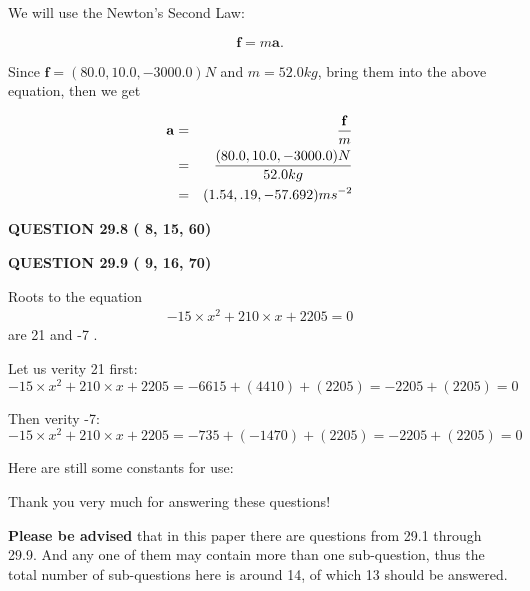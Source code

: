 \documentclass[12pt]{article}
\begin{document}
  
 
 

We will use the Newton's Second Law:
 
\[
\mathbf{f}=m\mathbf{a}.
\]
 
Since $\mathbf{f}= %
(80.0 , 10.0 , -3000.0) N$
and $m= %
52.0kg$, bring them into the above equation, then we get
 
\begin{eqnarray*}
\mathbf{a}&=&\frac{\mathbf{f}}m  \\
&=&\frac{ %
(80.0 , 10.0 , -3000.0) N}{ %
52.0kg}  \\
&=& %
(1.54 , .19 , -57.692) ms^{-2}
\end{eqnarray*}
 
 
 
  
\vspace{0.2in}
  
{\textbf{\Large{QUESTION
29.8 
 (          8,         15,         60)
}}}
  
  
 
 

 
 
  
\vspace{0.2in}
  
{\textbf{\Large{QUESTION
29.9 
 (          9,         16,         70)
}}}
  
  


 
 

Roots to the equation
\begin{eqnarray*}
-15 \times x^2  %
+  %
210
                 \times x    %
+  %
2205 =0
\end{eqnarray*}
are  %
21 and  %
-7 .
 
Let us verity  %
21 first:
$  %
-15 \times x^2  %
+  %
210
                 \times x    %
+  %
2205
  = %
-6615+( %
4410)+( %
2205)
  = %
-2205+( %
2205)
  = %
0
$
 
Then verity  %
-7:
$  %
-15 \times x^2  %
+  %
210
                 \times x    %
+  %
2205
  = %
-735+( %
-1470)+( %
2205)
  = %
-2205+( %
2205)
  = %
0
$
 
 
 
   
   
 \vspace{0.2in}
Here are still some constants for use:
 
 
 
 
Thank you very much for answering these questions!
 
{\textbf{\large{Please be advised}}} that in this paper there are questions from
29.1 through
29.9.
And any one of them may contain more than one sub-question, thus the total number
of sub-questions here is around 14, of which
13 should be answered.
 
\end{document}
